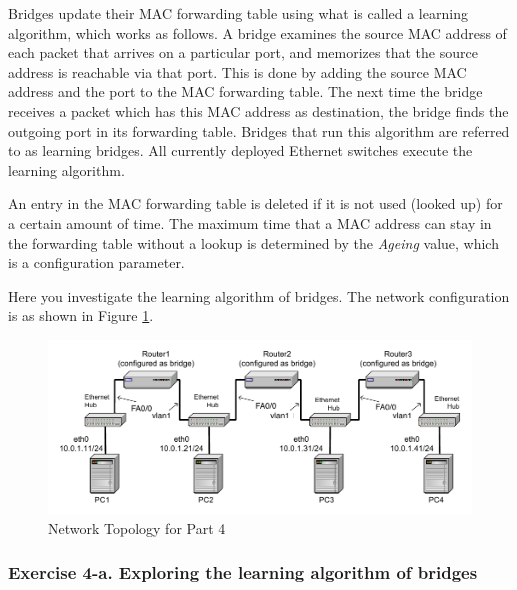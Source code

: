 Bridges update their MAC forwarding table using what is called a learning algorithm, which works as follows. A bridge examines the source MAC address of each packet that arrives on a particular port, and memorizes that the source address is reachable via that port. This is done by adding the source MAC address and the port to the MAC forwarding table. The next time the bridge receives a packet which has this MAC address as destination, the bridge finds the outgoing port in its forwarding table. Bridges that run this algorithm are referred to as learning bridges. All currently deployed Ethernet switches execute the learning algorithm.

An entry in the MAC forwarding table is deleted if it is not used (looked up) for a certain amount of time. The maximum time that a MAC address can stay in the forwarding table without a lookup is determined by the \emph{Ageing} value, which is a configuration parameter.

Here you investigate the learning algorithm of bridges. The network configuration is as shown in Figure \ref{fig:lab6-network4}.

\begin{figure}[h!t]
	\centering
	\includegraphics[width=\linewidth]{graphics/lab6-network4-updated.pdf}
	\caption{Network Topology for Part 4}
	\label{fig:lab6-network4}
\end{figure}

\subsubsection{Exercise 4-a. Exploring the learning algorithm of bridges}


